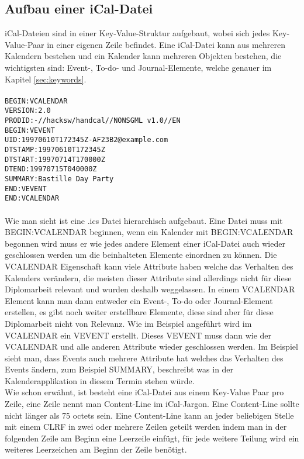 \subsection{Aufbau einer iCal-Datei}
\label{sec:aufbauEineriCalDatei}
iCal-Dateien sind in einer Key-Value-Struktur aufgebaut, wobei sich jedes Key-Value-Paar in einer eigenen Zeile befindet. Eine iCal-Datei kann aus mehreren Kalendern bestehen und ein Kalender kann mehreren Objekten bestehen, die wichtigsten sind: Event-, To-do- und Journal-Elemente, welche genauer im Kapitel \ref{sec:keywords}.\\\\
\texttt{BEGIN:VCALENDAR\\
 VERSION:2.0\\
 PRODID:-//hacksw/handcal//NONSGML v1.0//EN\\
 BEGIN:VEVENT\\
 UID:19970610T172345Z-AF23B2@example.com\\
 DTSTAMP:19970610T172345Z\\
 DTSTART:19970714T170000Z\\
 DTEND:19970715T040000Z\\
 SUMMARY:Bastille Day Party\\
 END:VEVENT\\
 END:VCALENDAR}\\\\
Wie man sieht ist eine .ics Datei hierarchisch aufgebaut. Eine Datei muss mit BEGIN:VCALENDAR beginnen, wenn ein Kalender mit BEGIN:VCALENDAR begonnen wird muss er wie jedes andere Element einer iCal-Datei auch wieder geschlossen werden um die beinhalteten Elemente einordnen zu können. Die VCALENDAR Eigenschaft kann viele Attribute haben welche das Verhalten des Kalenders verändern, die meisten dieser Attribute sind allerdings nicht für diese Diplomarbeit relevant und wurden deshalb weggelassen. In einem VCALENDAR Element kann man dann entweder ein Event-, To-do oder Journal-Element erstellen, es gibt noch weiter erstellbare Elemente, diese sind aber für diese Diplomarbeit nicht von Relevanz. Wie im Beispiel angeführt wird im VCALENDAR ein VEVENT erstellt. Dieses VEVENT muss dann wie der VCALENDAR und alle anderen Attribute wieder geschlossen werden. Im Beispiel sieht man, dass Events auch mehrere Attribute hat welches das Verhalten des Events ändern, zum Beispiel SUMMARY, beschreibt was in der Kalenderapplikation in diesem Termin stehen würde.\\
Wie schon erwähnt, ist besteht eine iCal-Datei aus einem Key-Value Paar pro Zeile, eine Zeile nennt man Content-Line im iCal-Jargon. Eine Content-Line sollte nicht länger als 75 octets sein. Eine Content-Line kann an jeder beliebigen Stelle mit einem CLRF in zwei oder mehrere Zeilen geteilt werden indem man in der folgenden Zeile am Beginn eine Leerzeile einfügt, für jede weitere Teilung wird ein weiteres Leerzeichen am Beginn der Zeile benötigt. \\\\
